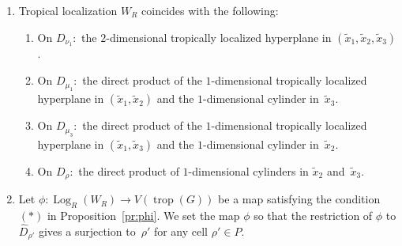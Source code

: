 \documentclass[pdftex]{sigma}
\numberwithin{equation}{section}
\begin{document}
\begin{enumerate}\itemsep=0pt
\item Tropical localization $W_R$ coincides with the following:
 \begin{enumerate}\itemsep=0pt
 \item On $D_{\nu_1} \colon$ the $2$-dimensional tropically localized hyperplane in $(\tilde{x}_1, \tilde{x}_2, \tilde{x}_3)$.
 \item On $D_{\mu_1} \colon$ the direct product of the $1$-dimensional tropically localized hyperplane in $(\tilde{x}_1, \tilde{x}_2)$ and the $1$-dimensional cylinder in~$\tilde{x}_3$.
 \item On $D_{\mu_3} \colon$ the direct product of the $1$-dimensional tropically localized hyperplane in $(\tilde{x}_1, \tilde{x}_3)$ and the $1$-dimensional cylinder in~$\tilde{x}_2$.
 \item On $D_{\rho} \colon$ the direct product of $1$-dimensional cylinders in $\tilde{x}_2$ and~$\tilde{x}_3$.
 \end{enumerate}

\item Let $\phi \colon \operatorname{Log}_R(W_R) \to V(\operatorname{trop}(G))$ be a map satisfying the condition $(\ast)$ in Proposition~\ref{pr:phi}.
We set the map $\phi$ so that the restriction of $\phi$ to $\widehat{D}_{\rho'}$ gives a surjection to~$\rho'$ for any cell $\rho' \in P$.


\end{enumerate}
\end{document}
